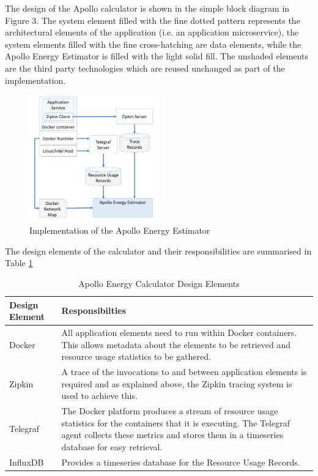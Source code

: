 The design of the Apollo calculator is shown in the simple block diagram in Figure 3. The system element filled with the fine dotted pattern represents the architectural elements of the application (i.e. an application microservice), the system elements filled with the fine cross-hatching are data elements, while the Apollo Energy Estimator is filled with the light solid fill.  The unshaded elements are the third party technologies which are reused unchanged as part of the implementation.

\begin{figure}
\centering
\includegraphics[width=0.5\textwidth]{Figures/implementation-design}
\caption{Implementation of the Apollo Energy Estimator}
\label{figure:implementation}
\end{figure}

The design elements of the calculator and their responsibilities are summarised in Table \ref{table:designelements}

\begin{table}
\centering
\caption{Apollo Energy Calculator Design Elements}
\label{table:designelements}
\footnotesize
\begin{tabular}{|l|l|}
\hline
Design Element & Responsibilties  \\
\hline
\hline
Docker         & All application elements need to run within Docker containers.  This allows metadata about the elements to be retrieved and resource usage statistics to be gathered. \\
Zipkin         & A trace of the invocations to and between application elements is required and as explained above, the Zipkin tracing system is used to achieve this. \\
Telegraf       & The Docker platform produces a stream of resource usage statistics for the containers that it is executing.  The Telegraf agent collects these metrics and stores them in a timeseries database for easy retrieval. \\
InfluxDB       & Provides a timeseries database for the Resource Usage Records. \\
\hline
\end{tabular}
\end{table}



